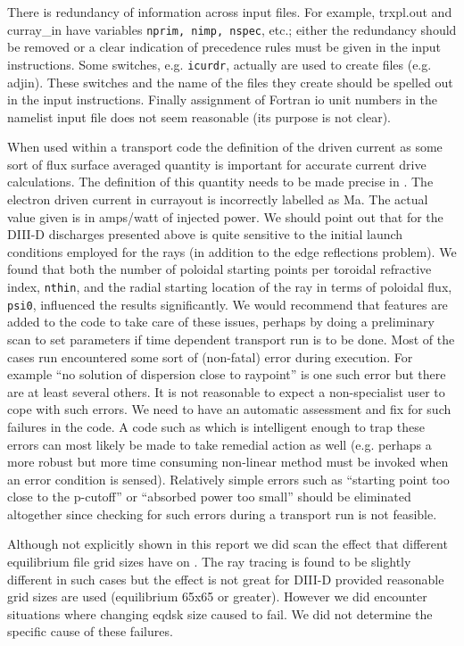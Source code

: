 There is redundancy of information across input files. For example,  
trxpl.out and curray\_in have variables \texttt{nprim, nimp, nspec}, etc.; either
the redundancy should be removed or a clear indication of precedence
rules must be given in the input instructions.
Some switches, e.g. \texttt{icurdr}, actually are used to create files
 (e.g. adjin). These switches and the name of the files  they create
 should be spelled out in the input instructions.
Finally assignment of Fortran io  unit numbers in the namelist input
  file does not seem reasonable (its purpose is not clear).



  When used within a transport code the definition of the driven
  current as some sort of flux surface averaged quantity is
  important  for accurate current drive calculations. The definition
  of this quantity needs to be made precise in \ct. The electron
  driven current in currayout is incorrectly labelled as Ma. The
  actual value given  is in amps/watt of injected power. 
   We should point out that for the DIII-D discharges
   presented above  \ct is
   quite sensitive to the initial launch conditions employed for the
   rays (in addition to the edge reflections problem).
   We found that both the number of poloidal starting points per
   toroidal refractive index, \texttt{nthin}, and the radial starting location
   of the ray in terms of poloidal flux, \texttt{psi0}, influenced the results
   significantly. We would recommend that features are added to the
   code to take care of these issues, perhaps by doing a preliminary
   scan to set parameters if time dependent transport run is to be done.
 Most of the cases run encountered some sort of (non-fatal)  error
 during execution. For example ``no solution of dispersion close to
   raypoint'' is one such error but there are at least several others.
 It is not reasonable to expect a non-specialist user to cope with such
 errors. We need to have an automatic
   assessment and fix for such failures in the code. A code such as \ct
   which is
   intelligent enough to trap these errors can most likely be made to
   take remedial action as well (e.g. perhaps a  more robust
but more time consuming  non-linear method
   must be invoked when an error condition is sensed).
  Relatively simple errors such as  ``starting point too close to the
 p-cutoff'' or ``absorbed power too small''  should be eliminated
  altogether since checking for such errors during a transport run is
  not feasible.
 
 Although not
explicitly shown in this report we did scan the effect that different
equilibrium file grid sizes have on \ct. The ray tracing is found  to
be slightly different in such cases but the effect is not great for
DIII-D provided reasonable grid sizes are used (equilibrium 65x65 or greater).
However we did encounter situations where changing eqdsk size caused 
\ct to fail. We did not determine the specific cause of these failures. 



